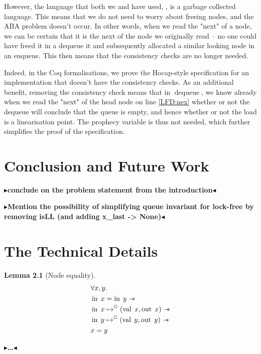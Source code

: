 \documentclass[a4paper, 11pt]{report}
\newtheorem{lemma}[theorem]{Lemma}
\newtheorem{definition}{Definition}[section]
\newcommand{\dequeue}{\operatorname{dequeue}}
\newcommand{\nIn}[1]{\operatorname{in} \; #1}
\newcommand{\nVal}[1]{\operatorname{val} \; #1}
\newcommand{\nOut}[1]{\operatorname{out} \; #1}
\newcommand{\isNode}[1]{\nIn{#1} \mapsto^{\persistently} (\nVal{#1}, \nOut{#1})}
\newcommand{\todo}[1]{{\color[rgb]{.5,0,0}\textbf{$\blacktriangleright$#1$\blacktriangleleft$}}}
\begin{document}
However, the language that both we and \cite{DBLP:conf/cpp/VindumB21} have used, \heaplang, is a garbage collected language. This means that we do not need to worry about freeing nodes, and the ABA problem doesn't occur. In other words, when we read the "next" of a node, we can be certain that it is the next of the node we originally read -- no one could have freed it in a dequeue it and subsequently allocated a similar looking node in an enqueue. This then means that the consistency checks are no longer needed. 

Indeed, in the Coq formalisations, we prove the Hocap-style specification for an implementation that doesn't have the consistency checks. As an additional benefit, removing the consistency check means that in $\dequeue$, we know already when we read the "next" of the head node on line \ref{LFD:nex} whether or not the dequeue will conclude that the queue is empty, and hence whether or not the load is a linearisation point. The prophecy variable is thus not needed, which further simplifies the proof of the specification.


\chapter{Conclusion and Future Work}
\label{ch:conclusion_fw}

\todo{conclude on the problem statement from the introduction}

\todo{Mention the possibility of simplifying queue invariant for lock-free by removing isLL (and adding x\_last -> None)}


\cleardoublepage
{}




\cleardoublepage
\appendix
\chapter{The Technical Details}

\begin{lemma}[Node equality]\label{lemma:nIn-equal}
  \begin{align*}
    &\All x, y.\\
    &\nIn{x} = \nIn{y} \wand\\
    &\isNode{x} \wand\\
    &\isNode{y} \wand\\
    &x = y
  \end{align*}
\end{lemma}


\todo{\dots}
\end{document}
